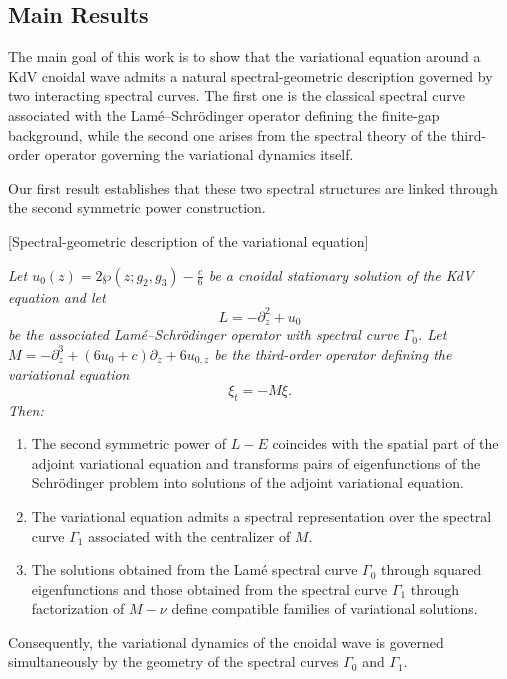 \documentclass[a4paper,12pt]{article}
\begin{document}
\subsection*{Main Results}


The main goal of this work is to show that the variational equation around a KdV cnoidal wave admits a natural spectral-geometric description governed by two interacting spectral curves. The first one is the classical spectral curve associated with the Lamé--Schrödinger operator defining the finite-gap background, while the second one arises from the spectral theory of the third-order operator governing the variational dynamics itself.

Our first result establishes that these two spectral structures are linked through the second symmetric power construction.

\medskip

 [Spectral-geometric description of the variational equation]

{\it 
Let \( 
u_0(z)=2\wp(z;g_2,g_3)-\frac{c}{6} \) be a cnoidal stationary solution of the KdV equation and let
\[
L=-\partial_z^2+u_0
\]
be the associated Lamé--Schrödinger operator with spectral curve \( 
\Gamma_0 \). Let \(  M=-\partial_z^3+(6u_0+c)\partial_z+6u_{0,z} \) be the third-order operator defining the variational equation
\[
\xi_t=-M\xi .
\]
Then:

\begin{enumerate}
\item The second symmetric power of $L-E$ coincides with the spatial part of the adjoint variational equation and transforms pairs of eigenfunctions of the Schrödinger problem into solutions of the adjoint variational equation.

\item The variational equation admits a spectral representation over the spectral curve ${\Gamma_1}$ associated with the centralizer of $M$.

\item The solutions obtained from the Lamé spectral curve $\Gamma_0$ through squared eigenfunctions and those obtained from the spectral curve ${\Gamma_1 }$ through factorization of $M-\nu$ define compatible families of variational solutions.
\end{enumerate}
}

Consequently, the variational dynamics of the cnoidal wave is governed simultaneously by the geometry of the spectral curves $\Gamma_0$ and ${\Gamma_1 }$.
\end{document}
